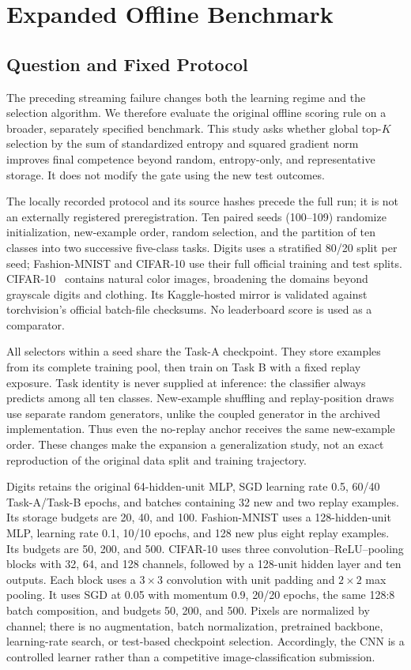 \section{Expanded Offline Benchmark}
\label{sec:expanded}
\subsection{Question and Fixed Protocol}
The preceding streaming failure changes both the learning regime and the
selection algorithm. We therefore evaluate the original offline scoring rule
on a broader, separately specified benchmark. This study asks whether global
top-$K$ selection by the sum of standardized entropy and squared gradient norm
improves final competence beyond random, entropy-only, and representative
storage. It does not modify the gate using the new test outcomes.

The locally recorded protocol and its source hashes precede the full run; it
is not an externally registered preregistration. Ten paired seeds (100--109)
randomize initialization, new-example order, random selection, and the partition
of ten classes into two successive five-class tasks. Digits uses a stratified
80/20 split per seed; Fashion-MNIST and CIFAR-10 use their full official training
and test splits. CIFAR-10~\cite{cifar} contains natural color images, broadening the domains
beyond grayscale digits and clothing. Its Kaggle-hosted mirror is validated
against torchvision's official batch-file checksums. No leaderboard score is
used as a comparator.

All selectors within a seed share the Task-A checkpoint. They store examples
from its complete training pool, then train on Task B with a fixed replay
exposure. Task identity is never supplied at inference: the classifier always
predicts among all ten classes. New-example shuffling and replay-position draws
use separate random generators, unlike the coupled generator in the archived
implementation. Thus even the no-replay anchor receives the same new-example
order. These changes make the expansion a generalization study, not an exact
reproduction of the original data split and training trajectory.

Digits retains the original 64-hidden-unit MLP, SGD learning rate 0.5, 60/40
Task-A/Task-B epochs, and batches containing 32 new and two replay examples.
Its storage budgets are 20, 40, and 100. Fashion-MNIST uses a 128-hidden-unit
MLP, learning rate 0.1, 10/10 epochs, and 128 new plus eight replay examples.
Its budgets are 50, 200, and 500. CIFAR-10 uses three convolution--ReLU--pooling
blocks with 32, 64, and 128 channels, followed by a 128-unit hidden layer and
ten outputs. Each block uses a $3\times3$ convolution with unit padding and
$2\times2$ max pooling. It uses SGD at 0.05 with momentum 0.9, 20/20 epochs, the same
128:8 batch composition, and budgets 50, 200, and 500. Pixels are normalized
by channel; there is no augmentation, batch normalization, pretrained backbone,
learning-rate search, or test-based checkpoint selection. Accordingly, the
CNN is a controlled learner rather than a competitive image-classification
submission.

